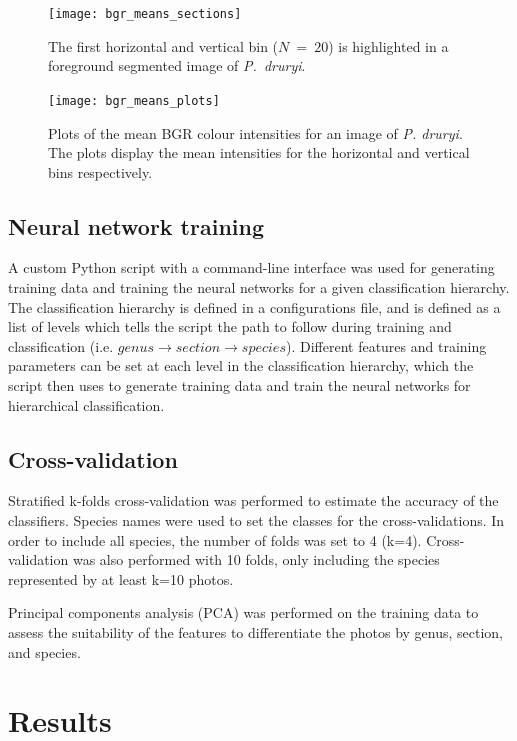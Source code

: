 \documentclass[3p,twocolumn,10pt]{elsarticle}
\begin{document}
\begin{figure}[h]
    \centering
    \texttt{[image: bgr\_means\_sections]}
    \caption{The first horizontal and vertical bin ($N~=~20$) is highlighted in a foreground segmented image of \textit{P.~druryi}.}
    \label{fig:bgr-means-sections}
\end{figure}

\begin{figure}[t]
    \centering
    \texttt{[image: bgr\_means\_plots]}
    \caption{Plots of the mean BGR colour intensities for an image of \textit{P. druryi}. The plots display the mean intensities for the horizontal and vertical bins respectively.}
    \label{fig:bgr-means-plots}
\end{figure}

\subsection{Neural network training}

A custom Python script with a command-line interface was used for generating training data and training the neural networks for a given classification hierarchy. The classification hierarchy is defined in a configurations file, and is defined as a list of levels which tells the script the path to follow during training and classification (i.e. $genus \rightarrow section \rightarrow species$). Different features and training parameters can be set at each level in the classification hierarchy, which the script then uses to generate training data and train the neural networks for hierarchical classification.

\subsection{Cross-validation}

Stratified k-folds cross-validation was performed to estimate the accuracy of the classifiers. Species names were used to set the classes for the cross-validations. In order to include all species, the number of folds was set to 4 (k=4). Cross-validation was also performed with 10 folds, only including the species represented by at least k=10 photos.

Principal components analysis (PCA) was performed on the training data to assess the suitability of the features to differentiate the photos by genus, section, and species.

\section{Results}
\label{sect:results}
\end{document}
